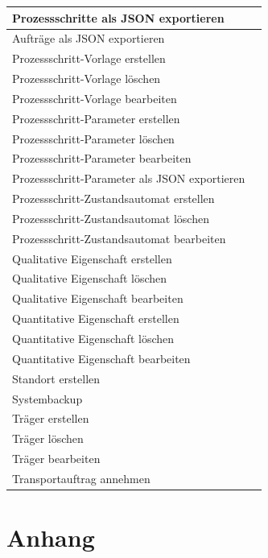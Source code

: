 \documentclass[enabledeprecatedfontcommands,fontsize=12pt,paper=a4,twoside]{scrartcl}
\begin{document}
\begin{longtable}[c]{|p{12cm}|p{3cm}|}
Prozessschritte als JSON exportieren  & \\ \hline
Aufträge als JSON exportieren & \\ \hline
Prozessschritt-Vorlage erstellen & \\ \hline
Prozessschritt-Vorlage löschen & \\ \hline
Prozessschritt-Vorlage bearbeiten & \\ \hline
Prozessschritt-Parameter erstellen & \\ \hline
Prozessschritt-Parameter löschen & \\ \hline
Prozessschritt-Parameter bearbeiten& \\ \hline
Prozessschritt-Parameter als JSON exportieren & \\ \hline
Prozessschritt-Zustandsautomat erstellen & \\ \hline
Prozessschritt-Zustandsautomat löschen & \\ \hline
Prozessschritt-Zustandsautomat bearbeiten & \\ \hline
Qualitative Eigenschaft erstellen & \\ \hline
Qualitative Eigenschaft löschen & \\ \hline
Qualitative Eigenschaft bearbeiten & \\ \hline
Quantitative Eigenschaft erstellen & \\ \hline
Quantitative Eigenschaft löschen & \\ \hline
Quantitative Eigenschaft bearbeiten & \\ \hline
Standort erstellen & \\ \hline
Systembackup & \\ \hline
Träger erstellen & \\ \hline
Träger löschen  & \\ \hline
Träger bearbeiten & \\ \hline
Transportauftrag annehmen  & \\ \hline

\end{longtable}


\clearpage
\section{Anhang}
\end{document}
